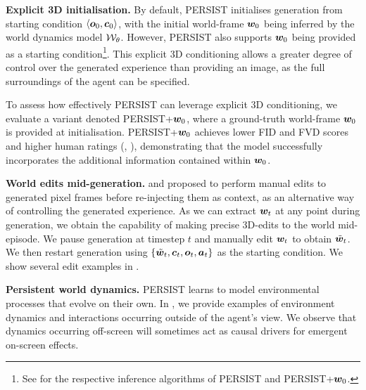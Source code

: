 \textbf{Explicit 3D initialisation.} By default, PERSIST initialises generation from starting condition $\langle {\bm{o}}_0, {\bm{c}}_0\rangle$, with the initial world-frame ${\bm{w}}_0$ being inferred by the world dynamics model ${\mathcal{W}}_\theta$. However, PERSIST also supports ${\bm{w}}_0$ being provided as a starting condition\footnote{See  for the respective inference algorithms of PERSIST and PERSIST+${\bm{w}}_0$.}. This explicit 3D conditioning allows a greater degree of control over the generated experience than providing an image, as the full surroundings of the agent can be specified.


To assess how effectively PERSIST can leverage explicit 3D conditioning, we evaluate a variant denoted PERSIST+${\bm{w}}_0$, where a ground-truth world-frame ${\bm{w}}_0$ is provided at initialisation. PERSIST+${\bm{w}}_0$ achieves lower FID and FVD scores and higher human ratings (, ), demonstrating that the model successfully incorporates the additional information contained within ${\bm{w}}_0$. %

\textbf{World edits mid-generation.} \citet{valevski2024diffusionmodelsrealtimegame} and \citet{kanervisto2025world} proposed to perform manual edits to generated pixel frames before re-injecting them as context, as an alternative way of controlling the generated experience. As we can extract ${\bm{w}}_t$ at any point during generation, we obtain the capability of making precise 3D-edits to the world mid-episode. We pause generation at timestep $t$ and manually edit ${\bm{w}}_t$ to obtain $\tilde{{\bm{w}}}_t$. We then restart generation using $\{\tilde{{\bm{w}}}_t, {\bm{c}}_t, {\bm{o}}_t, {\bm{a}}_t\}$ as the starting condition. We show several edit examples in . 

\textbf{Persistent world dynamics.} PERSIST learns to model environmental processes that evolve on their own. In , we provide examples of environment dynamics and interactions occurring outside of the agent's view. We observe that dynamics occurring off-screen will sometimes act as causal drivers for emergent on-screen effects.

